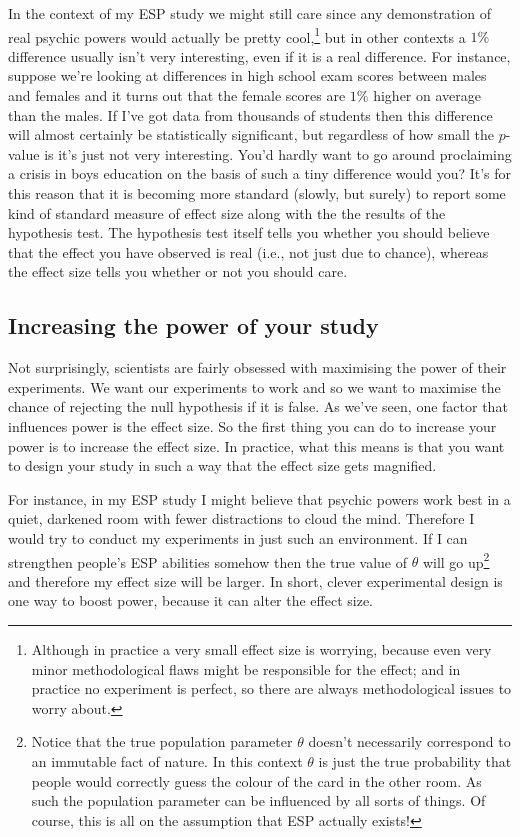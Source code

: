 \documentclass[
  a4paper,
]{book}
\begin{document}
In the context of my ESP study we might still care since any
demonstration of real psychic powers would actually be pretty
cool,\footnote{Although in practice a very small eﬀect size is worrying,
  because even very minor methodological flaws might be responsible for
  the eﬀect; and in practice no experiment is perfect, so there are
  always methodological issues to worry about.} but in other contexts a
\(1\%\) difference usually isn't very interesting, even if it is a real
difference. For instance, suppose we're looking at differences in high
school exam scores between males and females and it turns out that the
female scores are \(1\%\) higher on average than the males. If I've got
data from thousands of students then this difference will almost
certainly be statistically significant, but regardless of how small the
\(p\)-value is it's just not very interesting. You'd hardly want to go
around proclaiming a crisis in boys education on the basis of such a
tiny difference would you? It's for this reason that it is becoming more
standard (slowly, but surely) to report some kind of standard measure of
effect size along with the the results of the hypothesis test. The
hypothesis test itself tells you whether you should believe that the
effect you have observed is real (i.e., not just due to chance), whereas
the effect size tells you whether or not you should care.

\subsection{Increasing the power of your
study}\label{increasing-the-power-of-your-study}

Not surprisingly, scientists are fairly obsessed with maximising the
power of their experiments. We want our experiments to work and so we
want to maximise the chance of rejecting the null hypothesis if it is
false. As we've seen, one factor that influences power is the effect
size. So the first thing you can do to increase your power is to
increase the effect size. In practice, what this means is that you want
to design your study in such a way that the effect size gets magnified.

For instance, in my ESP study I might believe that psychic powers work
best in a quiet, darkened room with fewer distractions to cloud the
mind. Therefore I would try to conduct my experiments in just such an
environment. If I can strengthen people's ESP abilities somehow then the
true value of \(\theta\) will go up\footnote{Notice that the true
  population parameter \(\theta\) doesn't necessarily correspond to an
  immutable fact of nature. In this context \(\theta\) is just the true
  probability that people would correctly guess the colour of the card
  in the other room. As such the population parameter can be influenced
  by all sorts of things. Of course, this is all on the assumption that
  ESP actually exists!} and therefore my effect size will be larger. In
short, clever experimental design is one way to boost power, because it
can alter the effect size.
\end{document}

